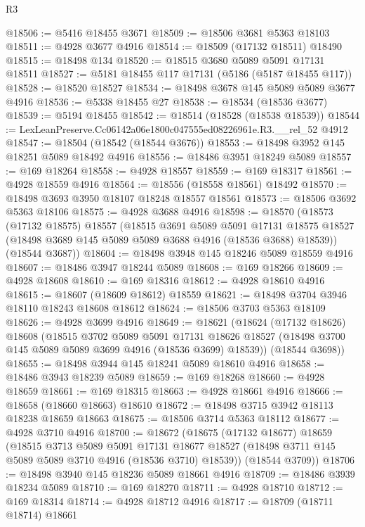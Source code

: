 \begin{lexlean}{R3}
\begin{coremodule}
@18506 := @5416 @18455 @3671
@18509 := @18506 @3681 @5363 @18103
@18511 := @4928 @3677 @4916
@18514 := @18509 (@17132 @18511) @18490
@18515 := @18498 @134
@18520 := @18515 @3680 @5089 @5091 @17131 @18511
@18527 := @5181 @18455 @117 @17131 (@5186 (@5187 @18455 @117))
@18528 := @18520 @18527
@18534 := @18498 @3678 @145 @5089 @5089 @3677 @4916
@18536 := @5338 @18455 @27
@18538 := @18534 (@18536 @3677)
@18539 := @5194 @18455
@18542 := @18514 (@18528 (@18538 @18539))
@18544 := LexLeanPreserve.Cc06142a06e1800c047555ed08226961e.R3.__rel_52 @4912
@18547 := @18504 (@18542 (@18544 @3676))
@18553 := @18498 @3952 @145 @18251 @5089 @18492 @4916
@18556 := @18486 @3951 @18249 @5089
@18557 := @169 @18264
@18558 := @4928 @18557
@18559 := @169 @18317
@18561 := @4928 @18559 @4916
@18564 := @18556 (@18558 @18561) @18492
@18570 := @18498 @3693 @3950 @18107 @18248 @18557 @18561
@18573 := @18506 @3692 @5363 @18106
@18575 := @4928 @3688 @4916
@18598 := @18570
    (@18573
      (@17132 @18575)
      @18557
      (@18515
        @3691
        @5089
        @5091
        @17131
        @18575
        @18527
        (@18498 @3689 @145 @5089 @5089 @3688 @4916 (@18536 @3688) @18539))
      (@18544 @3687))
@18604 := @18498 @3948 @145 @18246 @5089 @18559 @4916
@18607 := @18486 @3947 @18244 @5089
@18608 := @169 @18266
@18609 := @4928 @18608
@18610 := @169 @18316
@18612 := @4928 @18610 @4916
@18615 := @18607 (@18609 @18612) @18559
@18621 := @18498 @3704 @3946 @18110 @18243 @18608 @18612
@18624 := @18506 @3703 @5363 @18109
@18626 := @4928 @3699 @4916
@18649 := @18621
    (@18624
      (@17132 @18626)
      @18608
      (@18515
        @3702
        @5089
        @5091
        @17131
        @18626
        @18527
        (@18498 @3700 @145 @5089 @5089 @3699 @4916 (@18536 @3699) @18539))
      (@18544 @3698))
@18655 := @18498 @3944 @145 @18241 @5089 @18610 @4916
@18658 := @18486 @3943 @18239 @5089
@18659 := @169 @18268
@18660 := @4928 @18659
@18661 := @169 @18315
@18663 := @4928 @18661 @4916
@18666 := @18658 (@18660 @18663) @18610
@18672 := @18498 @3715 @3942 @18113 @18238 @18659 @18663
@18675 := @18506 @3714 @5363 @18112
@18677 := @4928 @3710 @4916
@18700 := @18672
    (@18675
      (@17132 @18677)
      @18659
      (@18515
        @3713
        @5089
        @5091
        @17131
        @18677
        @18527
        (@18498 @3711 @145 @5089 @5089 @3710 @4916 (@18536 @3710) @18539))
      (@18544 @3709))
@18706 := @18498 @3940 @145 @18236 @5089 @18661 @4916
@18709 := @18486 @3939 @18234 @5089
@18710 := @169 @18270
@18711 := @4928 @18710
@18712 := @169 @18314
@18714 := @4928 @18712 @4916
@18717 := @18709 (@18711 @18714) @18661

\end{coremodule}
\end{lexlean}

